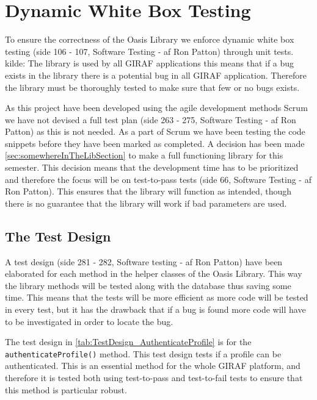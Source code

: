 \section{Dynamic White Box Testing}
\label{sec:DynamicWhiteBoxTesting}
To ensure the correctness of the Oasis Library we enforce dynamic white box testing (side 106 - 107, Software Testing - af Ron Patton) through unit tests. 
kilde: %
The library is used by all GIRAF applications this means that if a bug exists in the library there is a potential bug in all GIRAF application.
Therefore the library must be thoroughly tested to make sure that few or no bugs exists.

As this project have been developed using the agile development methods Scrum we have not devised a full test plan (side 263 - 275, Software Testing - af Ron Patton) as this is not needed.
As a part of Scrum we have been testing the code snippets before they have been marked as completed.
A decision has been made \autoref{sec:somewhereInTheLibSection} to make a full functioning library for this semester.
This decision means that the development time has to be prioritized and therefore the focus will be on test-to-pass tests (side 66, Software Testing - af Ron Patton).
This ensures that the library will function as intended, though there is no guarantee that the library will work if bad parameters are used.

\subsection{The Test Design}
A test design (side 281 - 282, Software testing - af Ron Patton) have been elaborated for each method in the helper classes of the Oasis Library.
This way the library methods will be tested along with the database thus saving some time.
This means that the tests will be more efficient as more code will be tested in every test, but it has the drawback that if a bug is found more code will have to be investigated in order to locate the bug.

The test design in \autoref{tab:TestDesign_AuthenticateProfile} is for the \texttt{authenticateProfile()} method.
This test design tests if a profile can be authenticated.
This is an essential method for the whole GIRAF platform, and therefore it is tested both using test-to-pass and test-to-fail tests to ensure that this method is particular robust.

